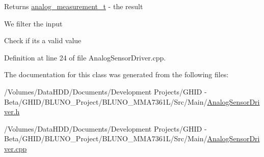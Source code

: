 \begin{DoxyReturn}{\-Returns}
\hyperlink{structanalog__measurement__t}{analog\-\_\-measurement\-\_\-t} -\/ the result 
\end{DoxyReturn}
\-We filter the input

\-Check if its a valid value 

\-Definition at line 24 of file \-Analog\-Sensor\-Driver.\-cpp.



\-The documentation for this class was generated from the following files\-:\begin{DoxyCompactItemize}
\item 
/\-Volumes/\-Data\-H\-D\-D/\-Documents/\-Development Projects/\-G\-H\-I\-D -\/ Beta/\-G\-H\-I\-D/\-B\-L\-U\-N\-O\-\_\-\-Project/\-B\-L\-U\-N\-O\-\_\-\-M\-M\-A7361\-L/\-Src/\-Main/\hyperlink{_analog_sensor_driver_8h}{\-Analog\-Sensor\-Driver.\-h}\item 
/\-Volumes/\-Data\-H\-D\-D/\-Documents/\-Development Projects/\-G\-H\-I\-D -\/ Beta/\-G\-H\-I\-D/\-B\-L\-U\-N\-O\-\_\-\-Project/\-B\-L\-U\-N\-O\-\_\-\-M\-M\-A7361\-L/\-Src/\-Main/\hyperlink{_analog_sensor_driver_8cpp}{\-Analog\-Sensor\-Driver.\-cpp}\end{DoxyCompactItemize}
